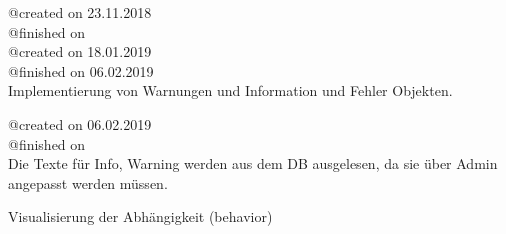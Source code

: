 \documentclass{article}
\begin{document}
\noindent @created on 23.11.2018\\
@finished on \\

\noindent @created on 18.01.2019\\
@finished on 06.02.2019\\
Implementierung von Warnungen und Information und Fehler Objekten.

\noindent @created on 06.02.2019\\
@finished on \\
Die Texte für Info, Warning werden aus dem DB ausgelesen, da sie über Admin angepasst werden müssen.

Visualisierung der Abhängigkeit (behavior)
\end{document}
